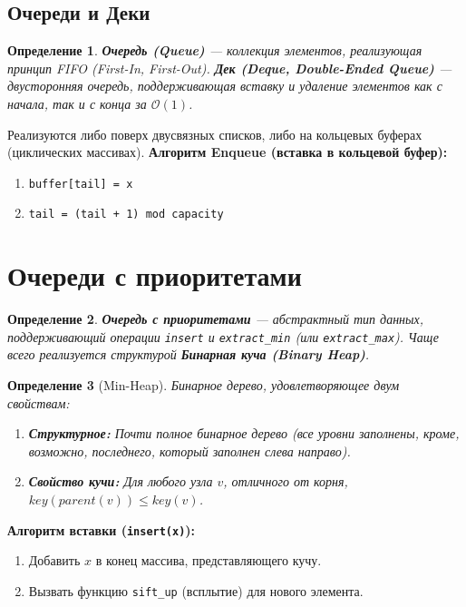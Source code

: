 \documentclass[12pt,a4paper]{article}
\newtheorem{definition}{Определение}
\begin{document}
\subsection{Очереди и Деки}
\begin{definition}
\textbf{Очередь (Queue)} — коллекция элементов, реализующая принцип FIFO (First-In, First-Out).
\textbf{Дек (Deque, Double-Ended Queue)} — двусторонняя очередь, поддерживающая вставку и удаление элементов как с начала, так и с конца за $\mathcal{O}(1)$.
\end{definition}

Реализуются либо поверх двусвязных списков, либо на кольцевых буферах (циклических массивах).
\textbf{Алгоритм Enqueue (вставка в кольцевой буфер):}
\begin{enumerate}
    \item \texttt{buffer[tail] = x}
    \item \texttt{tail = (tail + 1) mod capacity}
\end{enumerate}

\section{Очереди с приоритетами}
\begin{definition}
\textbf{Очередь с приоритетами} — абстрактный тип данных, поддерживающий операции \texttt{insert} и \texttt{extract\_min} (или \texttt{extract\_max}).
Чаще всего реализуется структурой \textbf{Бинарная куча (Binary Heap)}.
\end{definition}

\begin{definition}[Min-Heap]
Бинарное дерево, удовлетворяющее двум свойствам:
\begin{enumerate}
    \item \textbf{Структурное:} Почти полное бинарное дерево (все уровни заполнены, кроме, возможно, последнего, который заполнен слева направо).
    \item \textbf{Свойство кучи:} Для любого узла $v$, отличного от корня, $key(parent(v)) \le key(v)$.
\end{enumerate}
\end{definition}

\textbf{Алгоритм вставки (\texttt{insert(x)}):}
\begin{enumerate}
    \item Добавить $x$ в конец массива, представляющего кучу.
    \item Вызвать функцию \texttt{sift\_up} (всплытие) для нового элемента.
\end{enumerate}
\end{document}
